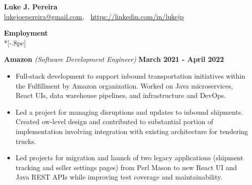 \documentclass{article}
\begin{document}
\begin{center}
{\Large \bf Luke J. Pereira} \\[.5pc]
\href{mailto:lukejoepereira@gmail.com}{lukejoepereira@gmail.com}, $\;$
\href{https://linkedin.com/in/lukejp}{https://linkedin.com/in/lukejp}
\\[3pc]
\end{center}
\vspace{-25pt}

{\large \bf Employment} \\*[-.8pc]
\underline{\hspace{7in}}

{\bf Amazon } \textit{(Software Development Engineer)} \hfill {\bf March 2021 - April 2022\/} 
\begin{itemize}[leftmargin=*]
    \itemsep0em
    \renewcommand\labelitemi{\tiny$\bullet$}
    \item Full-stack development to support inbound transportation initiatives within the Fulfillment by Amazon organization. Worked on Java microservices, React UIs, data warehouse pipelines, and infrastructure and DevOps.
    \item Led a project for managing disruptions and updates to inbound shipments. Created ow-level design and contributed to substantial portion of implementation involving integration with existing architecture for tendering trucks.
    \item Led projects for migration and launch of two legacy applications (shipment tracking and seller settings pages) from Perl Mason to new React UI and Java REST APIs while improving test coverage and maintainability.
\end{itemize}
\end{document}
